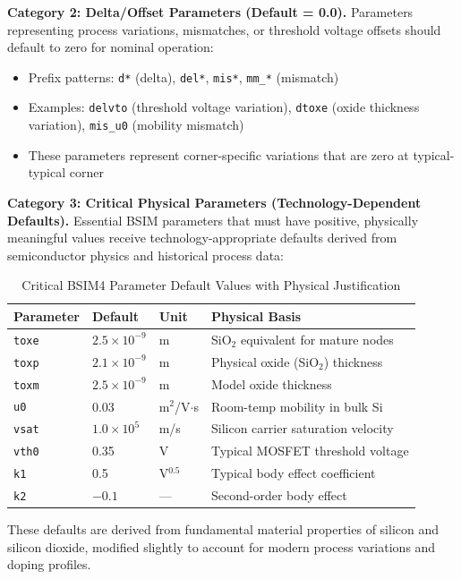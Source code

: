 \documentclass[10pt,twocolumn]{article}
\begin{document}
\textbf{Category 2: Delta/Offset Parameters (Default = 0.0).} Parameters representing process variations, mismatches, or threshold voltage offsets should default to zero for nominal operation:
\begin{itemize}
\item Prefix patterns: \texttt{d*} (delta), \texttt{del*}, \texttt{mis*}, \texttt{mm\_*} (mismatch)
\item Examples: \texttt{delvto} (threshold voltage variation), \texttt{dtoxe} (oxide thickness variation), \texttt{mis\_u0} (mobility mismatch)
\item These parameters represent corner-specific variations that are zero at typical-typical corner
\end{itemize}

\textbf{Category 3: Critical Physical Parameters (Technology-Dependent Defaults).} Essential BSIM parameters that must have positive, physically meaningful values receive technology-appropriate defaults derived from semiconductor physics and historical process data:

\begin{table}[!t]
\caption{Critical BSIM4 Parameter Default Values with Physical Justification}
\label{tab:critical_defaults}
\centering
\renewcommand{\arraystretch}{1.15}
\begin{tabular}{@{}llll@{}}
\toprule
\textbf{Parameter} & \textbf{Default} & \textbf{Unit} & \textbf{Physical Basis} \\
\midrule
\texttt{toxe} & $2.5\times10^{-9}$ & m & SiO$_2$ equivalent for mature nodes \\
\texttt{toxp} & $2.1\times10^{-9}$ & m & Physical oxide (SiO$_2$) thickness \\
\texttt{toxm} & $2.5\times10^{-9}$ & m & Model oxide thickness \\
\texttt{u0} & 0.03 & m$^2$/V$\cdot$s & Room-temp mobility in bulk Si \\
\texttt{vsat} & $1.0\times10^{5}$ & m/s & Silicon carrier saturation velocity \\
\texttt{vth0} & 0.35 & V & Typical MOSFET threshold voltage \\
\texttt{k1} & 0.5 & V$^{0.5}$ & Typical body effect coefficient \\
\texttt{k2} & $-0.1$ & --- & Second-order body effect \\
\bottomrule
\end{tabular}
\end{table}

These defaults are derived from fundamental material properties of silicon and silicon dioxide, modified slightly to account for modern process variations and doping profiles.
\end{document}
